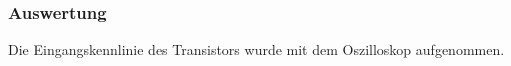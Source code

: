 \documentclass[12pt,a4paper]{article}
\begin{document}
\subsubsection{Auswertung}
Die Eingangskennlinie des Transistors wurde mit dem Oszilloskop aufgenommen.
\end{document}
